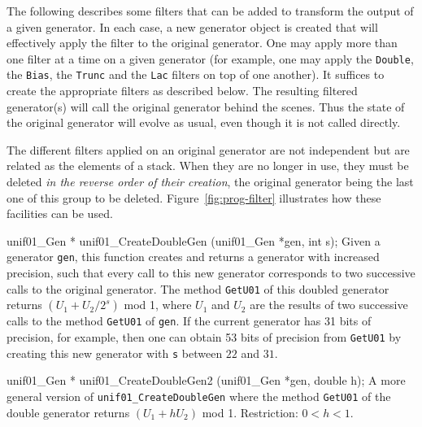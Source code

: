 
The following describes some filters that can be added to transform
the output of a given generator. In each case, a new generator object is
created that will effectively apply the filter to the original generator.
One may apply more than one filter at a time on a given generator
(for example, one may apply the {\tt Double}, the  {\tt Bias}, the
 {\tt Trunc} and the {\tt Lac} filters on top of one another). It suffices
 to create the appropriate filters as described below.  The resulting
filtered generator(s) will call the original generator behind the scenes.
Thus the state of the original generator will evolve as usual, even
though it is not called directly.


The different filters applied on an original generator are not independent
but are related as the elements of a stack. When they are no longer in use,
they must be deleted {\em in the reverse order of their creation},
the original generator being the last one of this group to be deleted.
Figure~\ref{fig:prog-filter} illustrates how these facilities can be used.

\code


unif01_Gen * unif01_CreateDoubleGen (unif01_Gen *gen, int s);
\endcode
 \tab
 Given a generator {\tt gen}, this function
%
 creates and returns a generator with increased precision, such that
 every call to this new generator
 corresponds to two successive calls  to the original generator.
 The method {\tt GetU01} of this doubled generator  returns
 $(U_1 +  U_2/2^s)$ mod 1, where $U_1$ and $U_2$ are the results of
 two successive calls  to the method {\tt GetU01} of {\tt gen}.
 If the current generator has 31 bits of precision, for example,
 then one can obtain 53 bits of precision from {\tt GetU01}
 by creating this new generator with {\tt s}  between $22$ and $31$.
 \endtab
\code


unif01_Gen * unif01_CreateDoubleGen2 (unif01_Gen *gen, double h);
\endcode
 \tab A more general version of {\tt unif01\_CreateDoubleGen} where
  the method {\tt GetU01} of the double generator  returns
  $(U_1 +  h U_2)$ mod 1. Restriction: $0 < h < 1$.
 \endtab
\code


